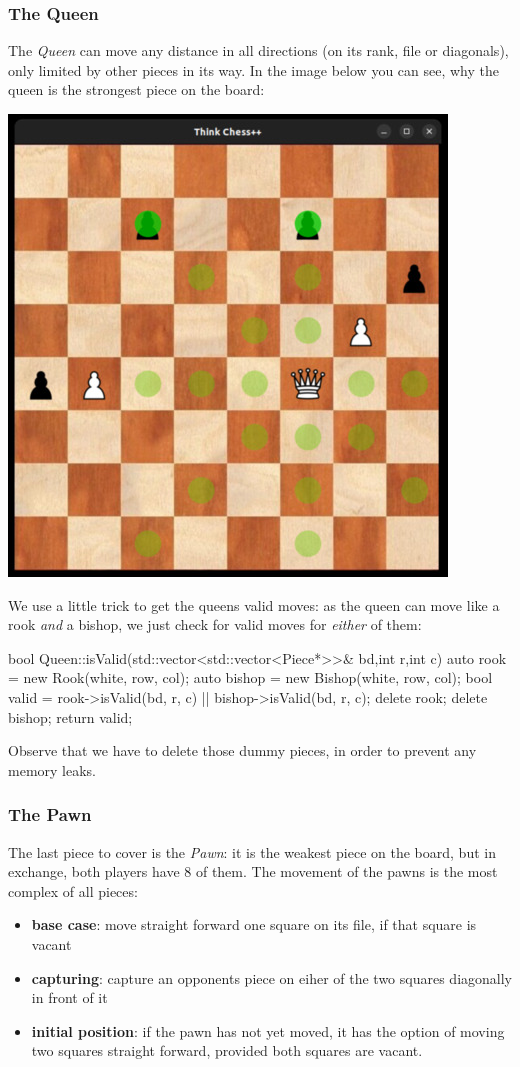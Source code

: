 \subsubsection{The Queen}
The \emph{Queen} can move any distance in all directions (on its rank, file or diagonals),
only limited by other pieces in its way.
In the image below you can see, why the queen is the strongest piece on the board:

\begin{center}
\includegraphics[width=.5\linewidth]{../img/queen.jpg}
\end{center}

We use a little trick to get the queens valid moves: as the queen can move like a rook
\emph{and} a bishop, we just check for valid moves for \emph{either} of them:

\begin{cpp}
bool Queen::isValid(std::vector<std::vector<Piece*>>& bd,int r,int c) {
  auto rook = new Rook(white, row, col);
  auto bishop = new Bishop(white, row, col);
  bool valid = rook->isValid(bd, r, c) || bishop->isValid(bd, r, c);
  delete rook;
  delete bishop;
  return valid;
}
\end{cpp}

Observe that we have to delete those dummy pieces, in order to prevent any memory leaks.

\subsubsection{The Pawn}
The last piece to cover is the \emph{Pawn}: it is the weakest piece on the board, but in
exchange, both players have 8 of them.
The movement of the pawns is the most complex of all pieces:

\begin{itemize}
  \item \textbf{base case}: move straight forward one square on its file, if that square is vacant
  \item \textbf{capturing}: capture an opponents piece on eiher of the two squares diagonally
    in front of it
  \item \textbf{initial position}: if the pawn has not yet moved, it has the option of moving two
    squares straight forward, provided both squares are vacant.
\end{itemize}

